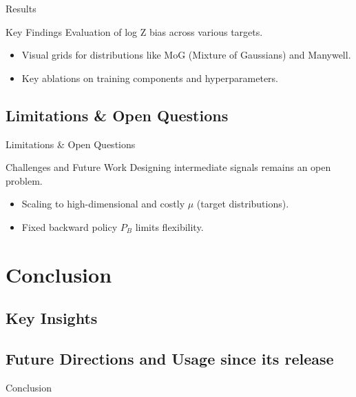 \documentclass[aspectratio=169,xcolor=dvipsnames]{beamer}
\begin{document}
\begin{frame}{Results}
    \begin{block}{Key Findings}
        Evaluation of log Z bias across various targets.
    \end{block}
    \begin{itemize}
        \item Visual grids for distributions like MoG (Mixture of Gaussians) and Manywell.
        \item Key ablations on training components and hyperparameters.
    \end{itemize}
\end{frame}

\subsection{Limitations \& Open Questions}

\begin{frame}{Limitations \& Open Questions}
    \begin{block}{Challenges and Future Work}
        Designing intermediate signals remains an open problem.
    \end{block}
    \begin{itemize}
        \item Scaling to high-dimensional and costly $\mu$ (target distributions).
        \item Fixed backward policy $P_B$ limits flexibility.
    \end{itemize}
\end{frame}

\section{Conclusion}

\subsection{Key Insights}

\subsection{Future Directions and Usage since its release}

\begin{frame}{Conclusion}

\end{frame}
\end{document}
